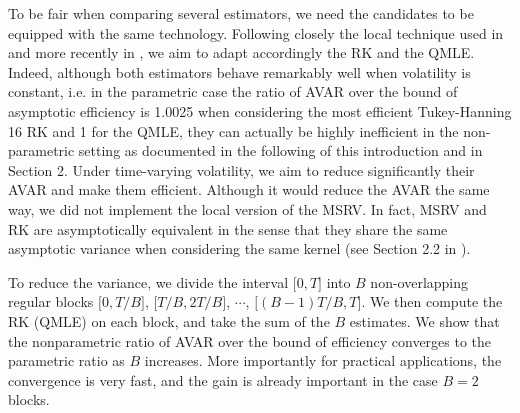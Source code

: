 \documentclass[11pt]{article}
\numberwithin{equation}{section}
\theoremstyle{plain}
\theoremstyle{remark}
\begin{document}
\smallskip
To be fair when comparing several estimators, we need the candidates to be equipped with the same technology. Following closely the local technique used in \cite{reiss2011asymptotic} and more recently in \cite{jacod2015microstructure}, we aim to adapt accordingly the RK and the QMLE. Indeed, although both estimators behave remarkably well when volatility is constant, i.e. in the parametric case the ratio of AVAR over the bound of asymptotic efficiency is 1.0025 when considering the most efficient Tukey-Hanning 16 RK and 1 for the QMLE, they can actually be highly inefficient in the non-parametric setting as documented in the following of this introduction and in Section 2. Under time-varying volatility, we aim to reduce significantly their AVAR and make them efficient. Although it would reduce the AVAR the same way, we did not implement the local version of the MSRV. In fact, MSRV and RK are asymptotically equivalent in the sense that they share the same asymptotic variance when considering the same kernel (see Section 2.2 in \cite{bibinger2016inference}).

\smallskip
To reduce the variance, we divide the interval $\big[0,T \big]$ into $B$ non-overlapping regular blocks $\big[ 0, T/B \big]$, $\big[ T/B, 2 T/B \big]$, $\cdots$, $\big[ (B-1)T/B, T \big]$. We then compute the RK (QMLE) on each block, and take the sum of the $B$ estimates. We show that the nonparametric ratio of AVAR over the bound of efficiency converges to the parametric ratio as $B$ increases. More importantly for practical applications, the convergence is very fast, and the gain is already important in the case $B=2$ blocks. 
\end{document}
